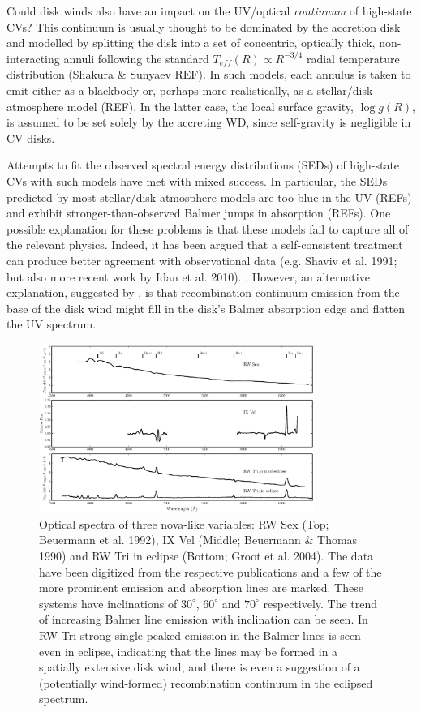 \documentclass[preprint, a4paper, 11pt]{aastex}
\begin{document}
Could disk winds also have an impact on the UV/optical {\em continuum}
of high-state CVs? This continuum is usually thought to be dominated
by the accretion disk and modelled by splitting the disk into
a set of concentric, optically thick, non-interacting annuli following
the standard $T_{eff}(R) \propto R^{-3/4}$ radial temperature
distribution (Shakura \& Sunyaev REF). In such
models, each annulus is taken to emit either as a blackbody or,
perhaps more realistically, as a stellar/disk atmosphere model
(REF). In the latter case, the local surface gravity, $\log{g}(R)$, is
assumed to be set solely by the accreting WD, since self-gravity is
negligible in CV disks.

Attempts to fit the observed spectral energy distributions (SEDs) of
high-state CVs with such models have met with mixed success. In
particular, the SEDs predicted by most stellar/disk atmosphere models 
are too blue in the UV (REFs) and exhibit
stronger-than-observed Balmer jumps in absorption (REFs). One possible
explanation for these problems is that these models fail to capture
all of the relevant physics. Indeed, it has been argued that a
self-consistent treatment can 
produce better agreement with observational data (e.g. Shaviv et
al. 1991;  but also more recent work by Idan et al. 2010). 
\nocite{idanshaviv2010} \nocite{shaviv1991}. However, an alternative 
explanation, suggested by \cite{KLWB98}, is that recombination continuum
emission from the base of the disk wind might fill in the disk's
Balmer absorption edge and flatten the UV spectrum. 

\begin{figure}	%
\centering
\includegraphics[width=0.8\textwidth]{figures/fig1.eps}
\caption{Optical spectra of three nova-like variables: 
RW Sex (Top; Beuermann et al. 1992),
IX Vel (Middle; Beuermann \& Thomas 1990)
and RW Tri in eclipse (Bottom; Groot et al. 2004).
The data have been digitized from the respective publications and a few of the more
prominent emission and absorption lines are marked. 
These systems have inclinations of $30^\circ$, $60^\circ$ and $70^\circ$ 
respectively.
The trend of increasing Balmer line emission with inclination can be seen.
In RW Tri strong single-peaked emission in the Balmer lines is seen even
in eclipse, indicating that the lines may be formed in a spatially
extensive disk wind, and there is even a suggestion 
of a (potentially wind-formed) recombination continuum in the eclipsed
spectrum.}
\label{novalikes}
\end{figure}
\end{document}
